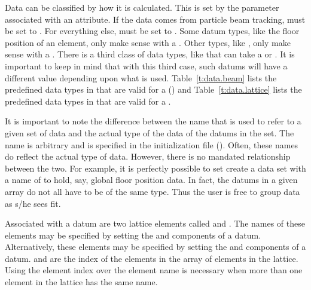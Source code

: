 Data can be classified by how it is calculated. This is set by the
 parameter associated with an attribute. If the data
comes from particle beam tracking,  must be set to
. For everything else,  must be set to
. Some datum types, like the floor position of an
element, only make sense with a  . Other
types, like , only make sense with a 
. There is a third class of data types, like
 that can take a  or 
. It is important to keep in mind that with this third
case, such datums will have a different value depending upon what
 is used.  Table~\ref{t:data.beam} lists the
predefined data types in \tao that are valid for a 
 () and
Table~\ref{t:data.lattice} lists the predefined data types in
\tao that are valid for a  .

It is important to note the difference between the  name
that is used to refer to a given set of data and the actual type of
the data of the datums in the set. The  name is arbitrary
and is specified in the \tao initialization file
(). Often, these names do reflect the actual type of
data. However, there is no mandated relationship between the two. For example,
it is perfectly possible to set create a data set with a 
name of  to hold, say, global floor position data. In
fact, the datums in a given  array do not all have to be of the
same type. Thus the user is free to group data as s/he sees fit.

Associated with a datum are two lattice elements called  and
.  The names of these elements may be specified by setting
the  and  components of a
datum. Alternatively, these elements may be specified by setting the
 and  components of a datum.  and
 are the index of the elements in the array of elements in
the lattice. Using the element index over the element name is
necessary when more than one element in the lattice has the same name.

